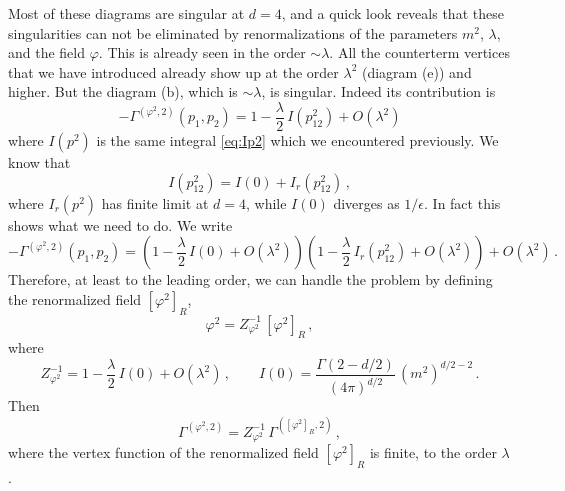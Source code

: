 Most of these diagrams are singular at $d=4$, and a quick look reveals that these
singularities can not be eliminated by renormalizations of the parameters $m^2$,
$\lambda$, and the field $\varphi$. This is already seen in the order
$\sim\lambda$. All the counterterm vertices that we have introduced already show
up at the order $\lambda^2$ (diagram (e)) and higher. But the diagram (b), which
is $\sim\lambda$, is singular. Indeed its contribution is
\[
-\Gamma^{(\varphi^2,2)}(p_1,p_2)=1-\frac\lambda2\,I(p_{12}^2)+O(\lambda^2)
\]
where $I(p^2)$ is the same integral \eqref{eq:Ip2} which we encountered
previously. We know that
\[
I(p_{12}^2)=I(0)+I_r(p_{12}^2)\,,
\]
where $I_r(p^2)$ has finite limit at $d=4$, while $I(0)$ diverges as $1/\epsilon$.
In fact this shows what we need to do. We write
\[
-\Gamma^{(\varphi^2,2)}(p_1,p_2)=\left(1-\frac\lambda2\,I(0)+O(\lambda^2)\right)\left(1-\frac\lambda2\,I_r(p_{12}^2)+O(\lambda^2)\right)+O(\lambda^2)\,.
\]
Therefore, at least to the leading order, we can handle the problem by defining
the renormalized field $[\varphi^2]_R$,
\begin{equation}\label{eq:phi2R}
\varphi^2=Z_{\varphi^2}^{-1}\,[\varphi^2]_R\,,
\end{equation}
where
\[
Z_{\varphi^2}^{-1}=1-\frac\lambda2\,I(0)+O(\lambda^2)\,,\qquad
I(0)=\frac{\Gamma(2-d/2)}{(4\pi)^{d/2}}\,(m^2)^{d/2-2}\,.
\]
Then
\[
\Gamma^{(\varphi^2,2)}=Z_{\varphi^2}^{-1}\,\Gamma^{([\varphi^2]_R,2)}\,,
\]
where the vertex function of the renormalized field $[\varphi^2]_R$ is finite,
to the order $\lambda$.

